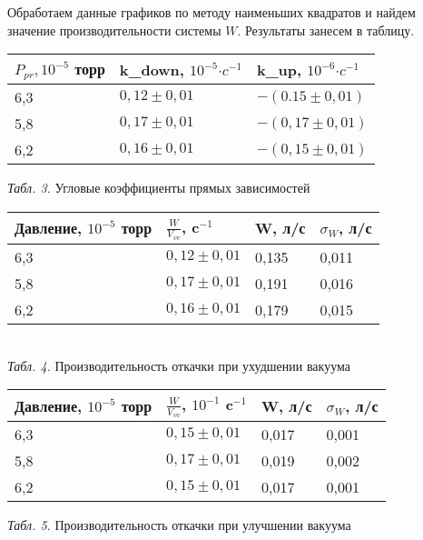 \documentclass{article}
\begin{document}
Обработаем данные графиков по методу наименьших квадратов и найдем значение производительности системы \(W\). Результаты занесем в таблицу.

\begin{center}
    \begin{tabular}{|m{8em}|m{8em}|m{8em}|}
        \hline
        \(P_{pr}, 10^{-5}\) торр &  k_{down}, \(10^{-5}\)\(\cdot c ^{-1}\) & k_{up}, \(10^{-6}\)\(\cdot c ^{-1}\)\\
        \hline
        6,3 & \(0,12 \pm 0,01\) & \(-(0.15 \pm 0,01)\) \\
        \hline
        5,8 & \(0,17 \pm 0,01\) & \(-(0,17 \pm 0,01)\) \\
        \hline
        6,2 & \(0,16 \pm 0,01\) & \(-(0,15 \pm 0,01)\) \\
        \hline
    \end{tabular}

    \textit{Табл. 3.} Угловые коэффициенты прямых зависимостей
\end{center}

\newpage

\begin{center}
    \begin{tabular}{|m{10em}|m{5em}|m{5em}|m{5em}|}
    \hline
    Давление, \(10^{-5}\) торр & \(\frac{W}{V_{vv}}\), c\(^{-1}\) & W, л/с & \(\sigma_{W}\), л/с \\
    \hline
    6,3 & \(0,12 \pm 0,01\) & 0,135 & 0,011 \\
    \hline
    5,8 & \(0,17 \pm 0,01\) & 0,191 & 0,016 \\
    \hline
    6,2 & \(0,16 \pm 0,01\) & 0,179 & 0,015 \\
    \hline
    \end{tabular}
    \\
    \textit{Табл. 4.} Производительность откачки при ухудшении вакуума
\end{center}


\begin{center}
    \begin{tabular}{|m{10em}|m{7em}|m{5em}|m{5em}|}
    \hline
    Давление, \(10^{-5}\) торр & \(\frac{W}{V_{vv}}\), \(10^{-1}\) c\(^{-1}\) & W, л/с & \(\sigma_{W}\), л/с \\
    \hline
    6,3 & \(0,15 \pm 0,01\) & 0,017 & 0,001 \\
    \hline
    5,8 & \(0,17 \pm 0,01\) & 0,019 & 0,002 \\
    \hline
    6,2 & \(0,15 \pm 0,01\) & 0,017 & 0,001 \\
    \hline
    \end{tabular}

    \textit{Табл. 5.} Производительность откачки при улучшении вакуума
\end{center}
\end{document}
